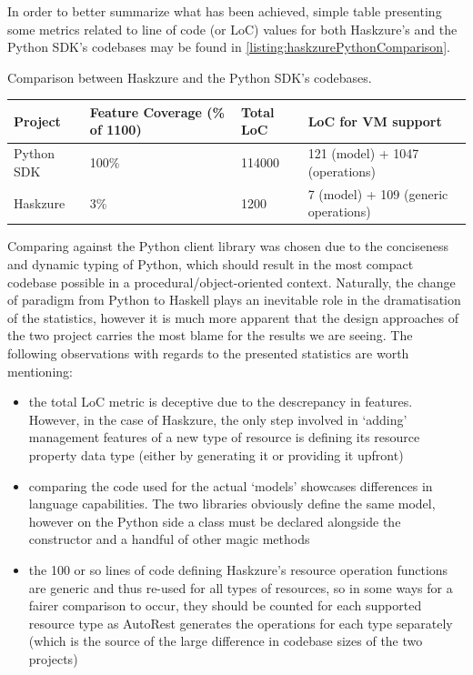 \documentclass[11pt]{report}
\begin{document}
In order to better summarize what has been achieved, simple table
presenting some metrics related to line of code (or LoC) values
for both Haskzure's and the Python SDK's codebases may be found in
\autoref{listing:haskzurePythonComparison}.

\begin{listing}[H]
\caption{Comparison between Haskzure and the Python SDK's codebases.}
\label{listing:haskzurePythonComparison}
\begin{center}
\begin{tabular}{ | l | l | l | l | }
    \hline
    Project    & Feature Coverage (\% of 1100) & Total LoC & LoC for VM support \\
    \hline \hline
    Python SDK & 100\%                   & 114000  & 121
    (model\cite{pythonSDKVMModel}) + 1047 (operations\cite{pythonSDKVMOps}) \\ \hline
    Haskzure   & 3\%                     & 1200    & 7 (model) + 109
    (generic operations) \\
    \hline
\end{tabular}
\end{center}
\end{listing}

Comparing against the Python client library was chosen due to the conciseness
and dynamic typing of Python, which should result in the most compact codebase
possible in a procedural/object-oriented context. Naturally, the change of
paradigm from Python to Haskell plays an inevitable role in the dramatisation
of the statistics, however it is much more apparent that the design approaches
of the two project carries the most blame for the results we are seeing.
\newline
The following observations with regards to the presented statistics are worth
mentioning:

\begin{itemize}
    \item{} the total LoC metric is deceptive due to the descrepancy in
        features. However, in the case of Haskzure, the only step involved in
        `adding' management features of a new type of resource is defining its
        resource property data type (either by generating it or providing it
        upfront)
    \item{} comparing the code used for the actual `models' showcases
        differences in language capabilities. The two libraries obviously
        define the same model, however on the Python side a class must be
        declared alongside the constructor and a handful of other magic methods
    \item{} the 100 or so lines of code defining Haskzure's resource
        operation functions are generic and thus re-used for all types of
        resources, so in some ways for a fairer comparison to occur,
        they should be counted for each supported resource type as AutoRest
        generates the operations for each type separately (which is the source
        of the large difference in codebase sizes of the two projects)
\end{itemize}
\end{document}
